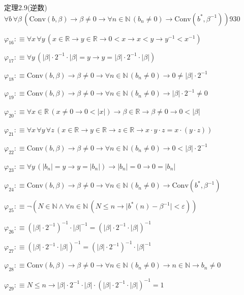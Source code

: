 \begin{fullproof}{定理2.9(逆数)}{$\forall b\,\forall \beta\,(\mathrm{Conv}(b,\beta) \to \beta \neq 0 \to \forall n \in \mathbb{N}\,(b_{n} \neq 0) \to \mathrm{Conv}(b^{\ast},\beta^{-1}))$}{930}
\begin{abbrevlist}
\item $\varphi_{16} :\equiv \forall x\,\forall y\,(x \in \mathbb{R} \to y \in \mathbb{R} \to 0 < x \to x < y \to y^{-1} < x^{-1})$
\item $\varphi_{17} :\equiv \forall y\,(\lvert \beta \rvert \cdot 2^{-1} \cdot \lvert \beta \rvert = y \to y = \lvert \beta \rvert \cdot 2^{-1} \cdot \lvert \beta \rvert)$
\item $\varphi_{18} :\equiv \mathrm{Conv}(b,\beta) \to \beta \neq 0 \to \forall n \in \mathbb{N}\,(b_{n} \neq 0) \to 0 \neq \lvert \beta \rvert \cdot 2^{-1}$
\item $\varphi_{19} :\equiv \mathrm{Conv}(b,\beta) \to \beta \neq 0 \to \forall n \in \mathbb{N}\,(b_{n} \neq 0) \to \lvert \beta \rvert \cdot 2^{-1} \neq 0$
\item $\varphi_{20} :\equiv \forall x \in \mathbb{R}\,(x \neq 0 \to 0 < \lvert x \rvert) \to \beta \in \mathbb{R} \to \beta \neq 0 \to 0 < \lvert \beta \rvert$
\item $\varphi_{21} :\equiv \forall x\,\forall y\,\forall z\,(x \in \mathbb{R} \to y \in \mathbb{R} \to z \in \mathbb{R} \to x \cdot y \cdot z = x \cdot (y \cdot z))$
\item $\varphi_{22} :\equiv \mathrm{Conv}(b,\beta) \to \beta \neq 0 \to \forall n \in \mathbb{N}\,(b_{n} \neq 0) \to 0 < \lvert \beta \rvert \cdot 2^{-1}$
\item $\varphi_{23} :\equiv \forall y\,(\lvert b_{n} \rvert = y \to y = \lvert b_{n} \rvert) \to \lvert b_{n} \rvert = 0 \to 0 = \lvert b_{n} \rvert$
\item $\varphi_{24} :\equiv \mathrm{Conv}(b,\beta) \to \beta \neq 0 \to \forall n \in \mathbb{N}\,(b_{n} \neq 0) \to \mathrm{Conv}(b^{\ast},\beta^{-1})$
\item $\varphi_{25} :\equiv \neg (N \in \mathbb{N} \land \forall n \in \mathbb{N}\,(N \leq n \to \lvert b^{\ast}(n) - \beta^{-1} \rvert < \varepsilon))$
\item $\varphi_{26} :\equiv (\lvert \beta \rvert \cdot 2^{-1})^{-1} \cdot \lvert \beta \rvert^{-1} = (\lvert \beta \rvert \cdot 2^{-1} \cdot \lvert \beta \rvert)^{-1}$
\item $\varphi_{27} :\equiv (\lvert \beta \rvert \cdot 2^{-1} \cdot \lvert \beta \rvert)^{-1} = (\lvert \beta \rvert \cdot 2^{-1})^{-1} \cdot \lvert \beta \rvert^{-1}$
\item $\varphi_{28} :\equiv \mathrm{Conv}(b,\beta) \to \beta \neq 0 \to \forall n \in \mathbb{N}\,(b_{n} \neq 0) \to n \in \mathbb{N} \to b_{n} \neq 0$
\item $\varphi_{29} :\equiv N \leq n \to \lvert \beta \rvert \cdot 2^{-1} \cdot \lvert \beta \rvert \cdot (\lvert \beta \rvert \cdot 2^{-1} \cdot \lvert \beta \rvert)^{-1} = 1$

\end{abbrevlist}
\end{fullproof}
